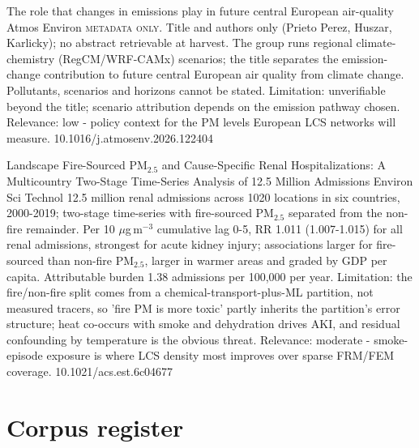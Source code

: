 \documentclass[10pt]{article}
\begin{document}
\par{}\baselineskip{}\baselineskip
{}

{The role that changes in emissions play in future central European air-quality}
{Atmos Environ}
{\textsc{metadata only.} Title and authors only (Prieto Perez, Huszar, Karlicky); no abstract retrievable at harvest. The group runs regional climate-chemistry (RegCM/WRF-CAMx) scenarios; the title separates the emission-change contribution to future central European air quality from climate change. Pollutants, scenarios and horizons cannot be stated. Limitation: unverifiable beyond the title; scenario attribution depends on the emission pathway chosen. Relevance: low - policy context for the PM levels European LCS networks will measure.}
{10.1016/j.atmosenv.2026.122404}

\par{}\baselineskip{}\baselineskip
{}

{Landscape Fire-Sourced PM$_{2.5}$ and Cause-Specific Renal Hospitalizations: A Multicountry Two-Stage Time-Series Analysis of 12.5 Million Admissions}
{Environ Sci Technol}
{12.5 million renal admissions across 1020 locations in six countries, 2000-2019; two-stage time-series with fire-sourced PM$_{2.5}$ separated from the non-fire remainder. Per 10 $\mu$g\,m$^{-3}$ cumulative lag 0-5, RR 1.011 (1.007-1.015) for all renal admissions, strongest for acute kidney injury; associations larger for fire-sourced than non-fire PM$_{2.5}$, larger in warmer areas and graded by GDP per capita. Attributable burden 1.38 admissions per 100,000 per year. Limitation: the fire/non-fire split comes from a chemical-transport-plus-ML partition, not measured tracers, so 'fire PM is more toxic' partly inherits the partition's error structure; heat co-occurs with smoke and dehydration drives AKI, and residual confounding by temperature is the obvious threat. Relevance: moderate - smoke-episode exposure is where LCS density most improves over sparse FRM/FEM coverage.}
{10.1021/acs.est.6c04677}

\clearpage
\section*{\sffamily\bfseries\color{Deep}Corpus register}
\vspace{-1.5mm}{\color{Amber}\rule{\linewidth}{1.1pt}}\vspace{2.5mm}
\end{document}
